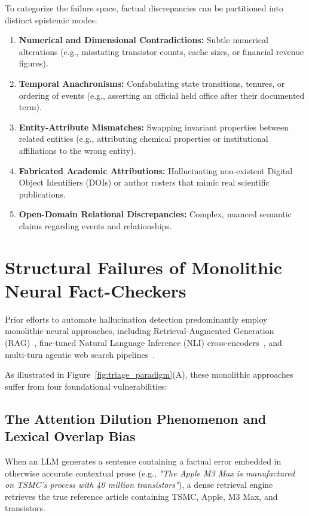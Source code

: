 To categorize the failure space, factual discrepancies can be partitioned into distinct epistemic modes:
\begin{enumerate}
    \item \textbf{Numerical and Dimensional Contradictions:} Subtle numerical alterations (e.g., misstating transistor counts, cache sizes, or financial revenue figures).
    \item \textbf{Temporal Anachronisms:} Confabulating state transitions, tenures, or ordering of events (e.g., asserting an official held office after their documented term).
    \item \textbf{Entity-Attribute Mismatches:} Swapping invariant properties between related entities (e.g., attributing chemical properties or institutional affiliations to the wrong entity).
    \item \textbf{Fabricated Academic Attributions:} Hallucinating non-existent Digital Object Identifiers (DOIs) or author rosters that mimic real scientific publications.
    \item \textbf{Open-Domain Relational Discrepancies:} Complex, nuanced semantic claims regarding events and relationships.
\end{enumerate}

\section{Structural Failures of Monolithic Neural Fact-Checkers}
\label{sec:structural_failures}

Prior efforts to automate hallucination detection predominantly employ monolithic neural approaches, including Retrieval-Augmented Generation (RAG)~\cite{lewis2020retrieval}, fine-tuned Natural Language Inference (NLI) cross-encoders~\cite{niu2024ragtruth,he2023deberta}, and multi-turn agentic web search pipelines~\cite{wei2024safe,gao2023factool}. 

As illustrated in Figure~\ref{fig:triage_paradigm}(A), these monolithic approaches suffer from four foundational vulnerabilities:

\subsection{The Attention Dilution Phenomenon and Lexical Overlap Bias}
When an LLM generates a sentence containing a factual error embedded in otherwise accurate contextual prose (e.g., \textit{"The Apple M3 Max is manufactured on TSMC's process with 40 million transistors"}), a dense retrieval engine retrieves the true reference article containing TSMC, Apple, M3 Max, and transistors. 

